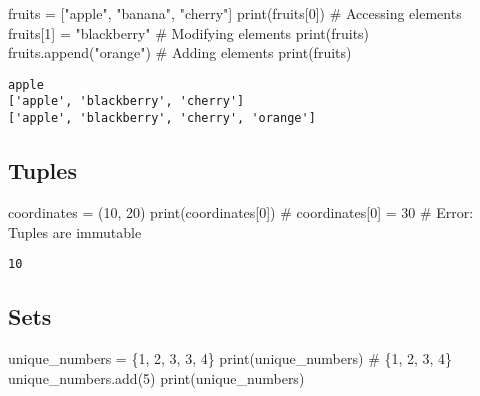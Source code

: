 \documentclass[
  letterpaper,
  DIV=11,
  numbers=noendperiod]{scrreprt}
\newenvironment{Shaded}{\begin{snugshade}}{\end{snugshade}}
\newcommand{\BuiltInTok}[1]{\textcolor[rgb]{0.00,0.23,0.31}{#1}}
\newcommand{\CommentTok}[1]{\textcolor[rgb]{0.37,0.37,0.37}{#1}}
\newcommand{\DecValTok}[1]{\textcolor[rgb]{0.68,0.00,0.00}{#1}}
\newcommand{\NormalTok}[1]{\textcolor[rgb]{0.00,0.23,0.31}{#1}}
\newcommand{\OperatorTok}[1]{\textcolor[rgb]{0.37,0.37,0.37}{#1}}
\newcommand{\StringTok}[1]{\textcolor[rgb]{0.13,0.47,0.30}{#1}}
\begin{document}
\begin{Shaded}
\begin{Highlighting}[]
\NormalTok{fruits }\OperatorTok{=}\NormalTok{ [}\StringTok{"apple"}\NormalTok{, }\StringTok{"banana"}\NormalTok{, }\StringTok{"cherry"}\NormalTok{]}
\BuiltInTok{print}\NormalTok{(fruits[}\DecValTok{0}\NormalTok{])  }\CommentTok{\# Accessing elements}
\NormalTok{fruits[}\DecValTok{1}\NormalTok{] }\OperatorTok{=} \StringTok{"blackberry"}  \CommentTok{\# Modifying elements}
\BuiltInTok{print}\NormalTok{(fruits)}
\NormalTok{fruits.append(}\StringTok{"orange"}\NormalTok{)  }\CommentTok{\# Adding elements}
\BuiltInTok{print}\NormalTok{(fruits)}
\end{Highlighting}
\end{Shaded}

\begin{verbatim}
apple
['apple', 'blackberry', 'cherry']
['apple', 'blackberry', 'cherry', 'orange']
\end{verbatim}

\subsection{Tuples}\label{tuples}

\begin{Shaded}
\begin{Highlighting}[]
\NormalTok{coordinates }\OperatorTok{=}\NormalTok{ (}\DecValTok{10}\NormalTok{, }\DecValTok{20}\NormalTok{)}
\BuiltInTok{print}\NormalTok{(coordinates[}\DecValTok{0}\NormalTok{])}
\CommentTok{\# coordinates[0] = 30  \# Error: Tuples are immutable}
\end{Highlighting}
\end{Shaded}

\begin{verbatim}
10
\end{verbatim}

\subsection{Sets}\label{sets}

\begin{Shaded}
\begin{Highlighting}[]
\NormalTok{unique\_numbers }\OperatorTok{=}\NormalTok{ \{}\DecValTok{1}\NormalTok{, }\DecValTok{2}\NormalTok{, }\DecValTok{3}\NormalTok{, }\DecValTok{3}\NormalTok{, }\DecValTok{4}\NormalTok{\}}
\BuiltInTok{print}\NormalTok{(unique\_numbers)  }\CommentTok{\# \{1, 2, 3, 4\}}
\NormalTok{unique\_numbers.add(}\DecValTok{5}\NormalTok{)}
\BuiltInTok{print}\NormalTok{(unique\_numbers)}
\end{Highlighting}
\end{Shaded}
\end{document}
